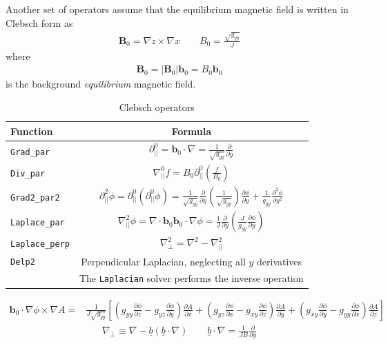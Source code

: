 \documentclass[12pt]{article}
\newcommand{\code}[1]{\texttt{#1}}
\newcommand{\deriv}[2]{\ensuremath{\frac{\partial #1}{\partial #2}}}
\begin{document}
Another set of operators assume that the equilibrium magnetic field is written
in Clebsch form as
%
%
\begin{align}
\mathbf{B}_0 = \nabla z\times\nabla x \qquad B_0 = \frac{\sqrt{g_{yy}}}{J}
\end{align}
%
where
%
\begin{align}
\mathbf{B}_0 = \left|\mathbf{B}_0\right|\mathbf{b}_0 = B_0 \mathbf{b}_0
\end{align}
%
is the background \emph{equilibrium} magnetic field.
%
\begin{table}[htb!]
\centering
\caption{Clebsch operators}
%
\label{tab:clebsch_operators}
%
\begin{tabular}{l c}
\hline
Function & Formula \\
\hline
\code{Grad\_par} & $\displaystyle\partial^0_{||} = \mathbf{b}_0\cdot\nabla =
\frac{1}{\sqrt{g_{yy}}}\deriv{}{y}$ \\
\code{Div\_par} & $\displaystyle \nabla^0_{||}f =
B_0\partial^0_{||}\left(\frac{f}{B_0}\right)$ \\
\code{Grad2\_par2} & $\displaystyle \partial^2_{||}\phi =
\partial^0_{||}\left(\partial^0_{||}\phi\right) =
\frac{1}{\sqrt{g_{yy}}}\deriv{}{y}\left(\frac{1}{\sqrt{g_{yy}}}\right)\deriv{
\phi}{y} + \frac{1}{g_{yy}}\frac{\partial^2\phi}{\partial y^2}$ \\
\code{Laplace\_par} & $\displaystyle \nabla_{||}^2\phi =
\nabla\cdot\mathbf{b}_0\mathbf{b}_0\cdot\nabla\phi =
\frac{1}{J}\deriv{}{y}\left(\frac{J}{g_{yy}}\deriv{\phi}{y}\right)$ \\
\code{Laplace\_perp} & $\displaystyle \nabla_\perp^2 = \nabla^2 - \nabla_{||}^2$
\\
\code{Delp2} & Perpendicular Laplacian, neglecting all $y$ derivatives \\
             & The \code{Laplacian} solver performs the inverse operation \\
\hline
\end{tabular}
%
\end{table}
%
\begin{eqnarray*}
\mathbf{b}_0\cdot\nabla\phi\times\nabla A =&
    \frac{1}{J\sqrt{g_{yy}}}\left[\left(g_{yy}\deriv{\phi}{z} -
        g_{yz}\deriv{\phi}{y}\right)\deriv{A}{x} + \left(g_{yz}\deriv{\phi}{x}
        - g_{xy}\deriv{\phi}{z}\right)\deriv{A}{y} +
        \left(g_{xy}\deriv{\phi}{y} -
    g_{yy}\deriv{\phi}{x}\right)\deriv{A}{z}\right]
\end{eqnarray*}
%
\begin{align}
\nabla_\perp \equiv \nabla - \underline{b}\left(\underline{b}\cdot\nabla\right)
\qquad \underline{b}\cdot\nabla = \frac{1}{JB}\frac{\partial}{\partial y}
\end{align}
\end{document}
